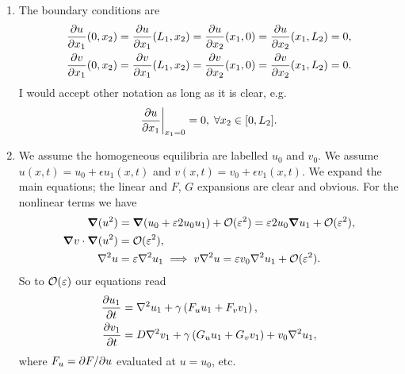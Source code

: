 \documentclass[a4paper, 12pt]{article}
\begin{document}
\begin{enumerate}[label={\bf \arabic{*}.\;}, ref={\arabic{*}},itemsep=3ex, left=0ex]
{\begin{enumerate}[label=(\alph*)]
          \item The boundary conditions are
            \begin{align}
              \pd{u}{x_1}(0,x_2)= \pd{u}{x_1}(L_1,x_2)=  \pd{u}{x_2}(x_1,0) = \pd{u}{x_2}(x_1,L_2)=0,\\
              \pd{v}{x_1}(0,x_2)= \pd{v}{x_1}(L_1,x_2)=  \pd{v}{x_2}(x_1,0) = \pd{v}{x_2}(x_1,L_2)=0.
            \end{align}
            I would accept other notation as long as it is clear, e.g.
            \begin{equation}
              \pd{u}{x_1}\bigg\vert_{x_1=0} = 0,\; \forall x_2\in[0,L_2].
            \end{equation}

          \item{
              We assume the homogeneous equilibria are labelled $u_0$  and $v_0$. We assume $u(x,t) = u_0+\epsilon u_1(x,t)$ and $v(x,t) = v_0+\epsilon v_1(x,t)$. We expand the main equations; the linear and $F$, $G$ expansions are clear and obvious. For the nonlinear terms we have
              \begin{align}
                \boldsymbol{\nabla} (u^2) &= \boldsymbol{\nabla}(u_0 + \varepsilon 2u_0 u_1) + \mathcal{O}(\varepsilon^2) = \varepsilon 2u_0\boldsymbol{\nabla} u_1 + \mathcal{O}(\varepsilon^2) ,\\
                \boldsymbol{\nabla} v\cdot \boldsymbol{\nabla} (u^2) &= \mathcal{O}(\varepsilon^2),\\
                \nabla^2  u  &= \varepsilon \nabla^2 u_1 \implies v\nabla^2  u=  \varepsilon v_0 \nabla^2 u_1 +  \mathcal{O}(\varepsilon^2).
              \end{align}
              So to $\mathcal{O}(\varepsilon)$ our equations read
              \begin{align}
                \pd{u_1}{t} &= \nabla^2 u_1 + \gamma\left(F_u u_1 + F_v v_1\right),\\
                \pd{v_1}{t} &= D\nabla^2 v_1 + \gamma\left(G_u u_1 + G_v v_1\right) + v_0 \nabla^2 u_1,
              \end{align}
              where $F_u = \pd{F}{u}$ evaluated at $u=u_0$, etc.

}
\end{enumerate}}
\end{enumerate}
\end{document}
